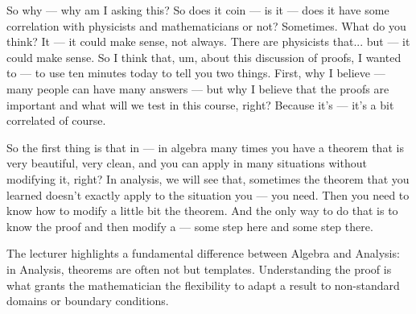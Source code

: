 \begin{spoken-clean}[00:26:15 - 00:28:30]
So why — why am I asking this? So does it coin — is it — does it have some correlation with physicists and mathematicians or not? Sometimes. What do you think? It — it could make sense, not always. There are physicists that... but — it could make sense. So I think that, um, about this discussion of proofs, I wanted to — to use ten minutes today to tell you two things. First, why I believe — many people can have many answers — but why I believe that the proofs are important and what will we test in this course, right? Because it's — it's a bit correlated of course.

So the first thing is that in — in algebra many times you have a theorem that is very beautiful, very clean, and you can apply in many situations without modifying it, right? In analysis, we will see that, sometimes the theorem that you learned doesn't exactly apply to the situation you — you need. Then you need to know how to modify a little bit the theorem. And the only way to do that is to know the proof and then modify a — some step here and some step there.
\end{spoken-clean}

\begin{didactic-insight}
The lecturer highlights a fundamental difference between Algebra and Analysis: in Analysis, theorems are often not  but templates. Understanding the proof is what grants the mathematician the flexibility to adapt a result to non-standard domains or boundary conditions.
\end{didactic-insight}

